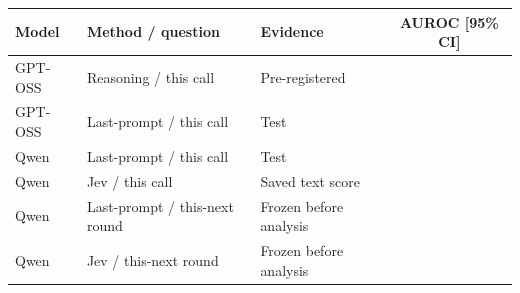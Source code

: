 \begin{tabular}{lllc}
\toprule
Model & Method / question & Evidence & AUROC [95\% CI] \\
\midrule
GPT-OSS & Reasoning / this call & Pre-registered & \gptossFreshReasoning{} \gptossFreshReasoningCI{} \\
GPT-OSS & Last-prompt / this call & Test & \gptossFreshCallProbe{} \gptossFreshCallProbeCI{} \\
Qwen & Last-prompt / this call & Test & \qwenFreshCallProbe{} \qwenFreshCallProbeCI{} \\
Qwen & Jev / this call & Saved text score & \qwenFreshCallJev{} \qwenFreshCallJevCI{} \\
Qwen & Last-prompt / this-next round & Frozen before analysis & \qwenFreshNearProbe{} \qwenFreshNearProbeCI{} \\
Qwen & Jev / this-next round & Frozen before analysis & \qwenFreshNearJev{} \qwenFreshNearJevCI{} \\
\bottomrule
\end{tabular}
